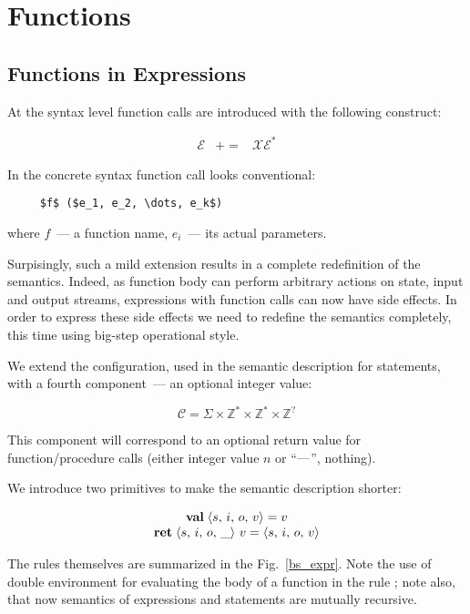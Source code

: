 \section{Functions}

\subsection{Functions in Expressions}

At the syntax level function calls are introduced with the following construct: 

\[
\begin{array}{rcl}
  \mathscr E & += & \mathscr X \mathscr E^*
\end{array}
\]

In the concrete syntax function call looks conventional:

\begin{lstlisting}
     $f$ ($e_1, e_2, \dots, e_k$)
\end{lstlisting}

where $f$~--- a function name, $e_i$~--- its actual parameters.

Surpisingly, such a mild extension results in a complete redefinition of the semantics. Indeed, as function body can perform
arbitrary actions on state, input and output streams, expressions with function calls can now have side effects. In order to express these
side effects we need to redefine the semantics completely, this time using big-step operational style.

We extend the configuration, used in the semantic description for statements, with a fourth component~--- an optional integer value:

\[
\mathscr C = \Sigma \times \mathbb Z^* \times \mathbb Z^* \times \mathbb Z^?
\]

This component will correspond to an optional return value for function/procedure calls (either integer value $n$ or ``$\hbox{---}$'', nothing).

We introduce two primitives to make the semantic description shorter:

\[
\begin{array}{c}
  \mathbf{val}\;{\left<{s,\,i,\,o,\,v}\right>}=v\\
  \mathbf{ret}\;{\left<{s,\,i,\,o,\,\_}\right>\,v}=\left<{s,\,i,\,o,\,v}\right>
\end{array}
\]


The rules themselves are summarized in the Fig.~\ref{bs_expr}. Note the use of double environment for evaluating the body of a function in the rule
; note also, that now semantics of expressions and statements are mutually recursive.

